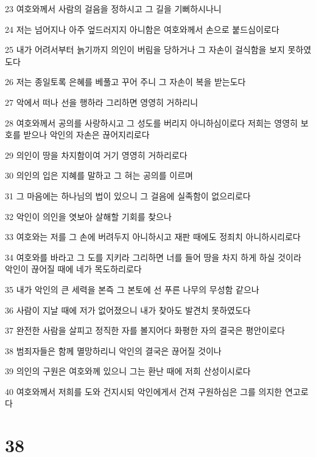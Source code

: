 \par 23 여호와께서 사람의 걸음을 정하시고 그 길을 기뻐하시나니
\par 24 저는 넘어지나 아주 엎드러지지 아니함은 여호와께서 손으로 붙드심이로다
\par 25 내가 어려서부터 늙기까지 의인이 버림을 당하거나 그 자손이 걸식함을 보지 못하였도다
\par 26 저는 종일토록 은혜를 베풀고 꾸어 주니 그 자손이 복을 받는도다
\par 27 악에서 떠나 선을 행하라 그리하면 영영히 거하리니
\par 28 여호와께서 공의를 사랑하시고 그 성도를 버리지 아니하심이로다 저희는 영영히 보호를 받으나 악인의 자손은 끊어지리로다
\par 29 의인이 땅을 차지함이여 거기 영영히 거하리로다
\par 30 의인의 입은 지혜를 말하고 그 혀는 공의를 이르며
\par 31 그 마음에는 하나님의 법이 있으니 그 걸음에 실족함이 없으리로다
\par 32 악인이 의인을 엿보아 살해할 기회를 찾으나
\par 33 여호와는 저를 그 손에 버려두지 아니하시고 재판 때에도 정죄치 아니하시리로다
\par 34 여호와를 바라고 그 도를 지키라 그리하면 너를 들어 땅을 차지 하게 하실 것이라 악인이 끊어질 때에 네가 목도하리로다
\par 35 내가 악인의 큰 세력을 본즉 그 본토에 선 푸른 나무의 무성함 같으나
\par 36 사람이 지날 때에 저가 없어졌으니 내가 찾아도 발견치 못하였도다
\par 37 완전한 사람을 살피고 정직한 자를 볼지어다 화평한 자의 결국은 평안이로다
\par 38 범죄자들은 함께 멸망하리니 악인의 결국은 끊어질 것이나
\par 39 의인의 구원은 여호와께 있으니 그는 환난 때에 저희 산성이시로다
\par 40 여호와께서 저희를 도와 건지시되 악인에게서 건져 구원하심은 그를 의지한 연고로다

\chapter{38}

